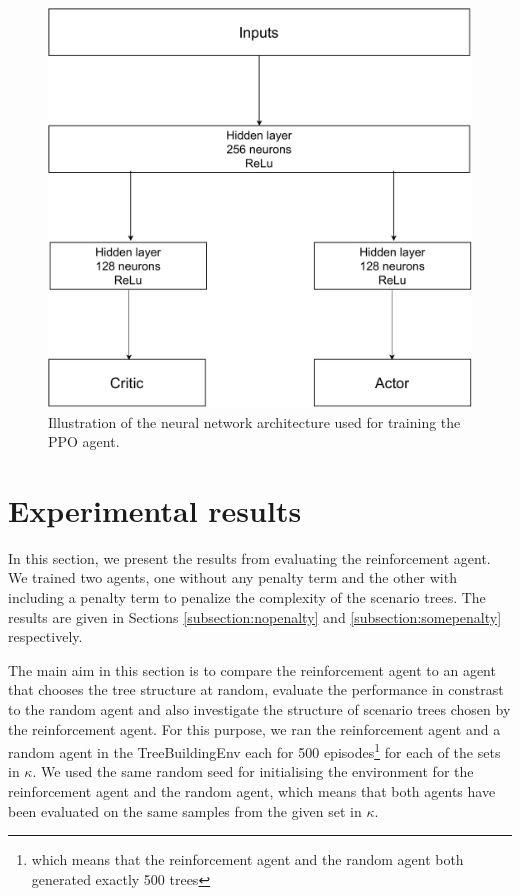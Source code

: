 \begin{figure}[H]
  \centering
  \includegraphics[width=\linewidth / 2]{../img/nn_diagram.pdf}
  \caption{Illustration of the neural network architecture used for training the PPO agent.}
  \label{fig:neuralnet}
\end{figure}

\section{Experimental results}
\label{section:experimental_results}
In this section, we present the results from evaluating the reinforcement agent. We trained two agents, one without any penalty term and the other with including a penalty term to penalize the complexity of the scenario trees. The results are given in Sections \ref{subsection:nopenalty} and \ref{subsection:somepenalty} respectively.
 
The main aim in this section is to compare the reinforcement agent to an agent that chooses the tree structure at random, evaluate the performance in constrast to the random agent and also investigate the structure of scenario trees chosen by the reinforcement agent. For this purpose, we ran the reinforcement agent and a random agent in the TreeBuildingEnv each for 500 episodes\footnote{which means that the reinforcement agent and the random agent both generated exactly 500 trees} for each of the sets in $\kappa$. We used the same random seed for initialising the environment for the reinforcement agent and the random agent, which means that both agents have been evaluated on the same samples from the given set in $\kappa$.


